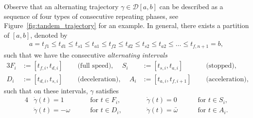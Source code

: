 \documentclass[a4paper]{report}
\theoremstyle{definition}
\theoremstyle{plain}
\begin{document}
Observe that an alternating trajectory $\gamma \in \mathcal{D}[a,b]$ can be described
as a sequence of four types of consecutive repeating phases, see
Figure~\ref{fig:tandem_trajectory} for an example.
%
In general, there exists a partition of $[a,b]$, denoted by
\begin{align*}
  a = t_{f1} \leq t_{d1} \leq t_{s1} \leq t_{a1} \leq t_{f2} \leq t_{d2} \leq t_{s2} \leq t_{a2} \leq \dots \leq t_{f,n+1} = b,
\end{align*}
such that we have the consecutive \emph{alternating intervals}
\begin{alignat*}{3}
  F_{i} &:= [t_{f,i}, t_{d,i}] \quad &\text{ (full speed), } \quad
  S_{i} &:= [t_{s,i}, t_{a,i}] \quad &\text{ (stopped), } \\
  D_{i} &:= [t_{d,i}, t_{s,i}] \quad &\text{ (deceleration), } \quad
  A_{i} &:= [t_{a,i}, t_{f,i+1}] \quad  &\text{ (acceleration), }
\end{alignat*}
%
such that on these intervals, $\gamma$ satisfies
%
\begin{alignat*}{4}
  &\dot{\gamma}(t) = 1 && \text{ for } t \in F_{i} , \quad \quad
  &&\dot{\gamma}(t) = 0 && \text{ for } t \in S_{i} ,\\
  &\ddot{\gamma}(t) = -\omega \quad && \text{ for } t \in D_{i} , \quad \quad
  &&\ddot{\gamma}(t) = \bar{\omega} \quad && \text{ for } t \in A_{i} .
\end{alignat*}
\end{document}

